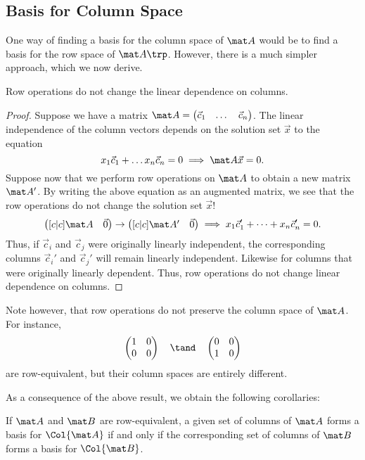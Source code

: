 \subsection{Basis for Column Space}

One way of finding a basis for the column space of $\mat A$ would be to find a basis for the row space of $\mat A \trp$. However, there is a much simpler approach, which we now derive.

\begin{proposition}\label{prop:lin-alg:row-lindep}
    Row operations do not change the linear dependence on columns.
\end{proposition}
\begin{proof}
    Suppose we have a matrix $\mat A = \begin{pmatrix}\vec c_1 & \dots & \vec c_n\end{pmatrix}$. The linear independence of the column vectors depends on the solution set $\vec x$ to the equation \[x_1 \vec c_1 + \dots x_n \vec c_n = 0 \implies \mat A \vec x = 0.\] Suppose now that we perform row operations on $\mat A$ to obtain a new matrix $\mat A'$. By writing the above equation as an augmented matrix, we see that the row operations do not change the solution set $\vec x$! \[\begin{pmatrix}[c|c]\mat A & \vec 0\end{pmatrix} \rightarrow \begin{pmatrix}[c|c]\mat A' & \vec 0\end{pmatrix} \implies x_1 \vec c_1' + \dots + x_n \vec c_n' = 0.\] Thus, if $\vec c_i$ and $\vec c_j$ were originally linearly independent, the corresponding columns $\vec c_i'$ and $\vec c_j'$ will remain linearly independent. Likewise for columns that were originally linearly dependent. Thus, row operations do not change linear dependence on columns.
\end{proof}

Note however, that row operations do not preserve the column space of $\mat A$. For instance, \[\begin{pmatrix}1 & 0 \\ 0 & 0\end{pmatrix} \quad \tand \quad \begin{pmatrix}0 & 0 \\ 1 & 0\end{pmatrix}\] are row-equivalent, but their column spaces are entirely different.

As a consequence of the above result, we obtain the following corollaries:
\begin{corollary}
    If $\mat A$ and $\mat B$ are row-equivalent, a given set of columns of $\mat A$ forms a basis for $\Col{\mat A}$ if and only if the corresponding set of columns of $\mat B$ forms a basis for $\Col{\mat B}$.
\end{corollary}


